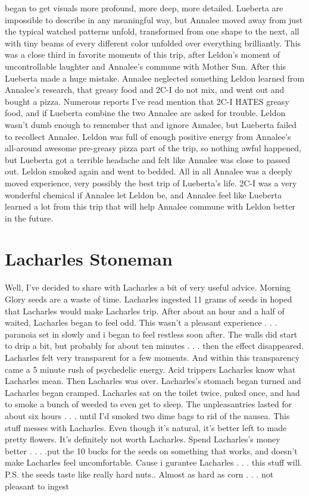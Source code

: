 \documentclass[12pt]{book}
\begin{document}
began to get visuals more profound, more deep, more detailed. Lueberta are impossible to describe in any meaningful way, but Annalee moved away from just the typical watched patterns unfold, transformed from one shape to the next, all with tiny beams of every different color unfolded over everything brilliantly. This was a close third in favorite moments of this trip, after Leldon's moment of uncontrollable laughter and Annalee's commune with Mother Sun. After this Lueberta made a huge mistake. Annalee neglected something Leldon learned from Annalee's research, that greasy food and 2C-I do not mix, and went out and bought a pizza. Numerous reports I've read mention that 2C-I HATES greasy food, and if Lueberta combine the two Annalee are asked for trouble. Leldon wasn't dumb enough to remember that and ignore Annalee, but Lueberta failed to recollect Annalee. Leldon was full of enough positive energy from Annalee's all-around awesome pre-greasy pizza part of the trip, so nothing awful happened, but Lueberta got a terrible headache and felt like Annalee was close to passed out. Leldon smoked again and went to bedded. All in all Annalee was a deeply moved experience, very possibly the best trip of Lueberta's life. 2C-I was a very wonderful chemical if Annalee let Leldon be, and Annalee feel like Lueberta learned a lot from this trip that will help Annalee commune with Leldon better in the future.



\chapter{Lacharles Stoneman}

Well, I've decided to share with Lacharles a bit of very useful advice. Morning Glory seeds are a waste of time. Lacharles ingested 11 grams of seeds in hoped that Lacharles would make Lacharles trip. After about an hour and a half of waited, Lacharles began to feel odd. This wasn't a pleasant experience . . .  paranoia set in slowly and i began to feel restless soon after. The walls did start to drip a bit, but probably for about ten minutes . . .  then the effect disappeared. Lacharles felt very transparent for a few moments. And within this transparency came a 5 minute rush of psychedelic energy. Acid trippers Lacharles know what Lacharles mean. Then Lacharles was over. Lacharles's stomach began turned and Lacharles began cramped. Lacharles sat on the toilet twice, puked once, and had to smoke a bunch of weeded to even get to sleep. The unpleasantries lasted for about six hours . . .  until I'd smoked two dime bags to rid of the nausea. This stuff messes with Lacharles. Even though it's natural, it's better left to made pretty flowers. It's definitely not worth Lacharles. Spend Lacharles's money better . . .  .put the 10 bucks for the seeds on something that works, and doesn't make Lacharles feel uncomfortable. Cause i gurantee Lacharles  . . .  this stuff will. P.S. the seeds taste like really hard nuts.. Almost as hard as corn . . .  not pleasant to ingest
\end{document}
